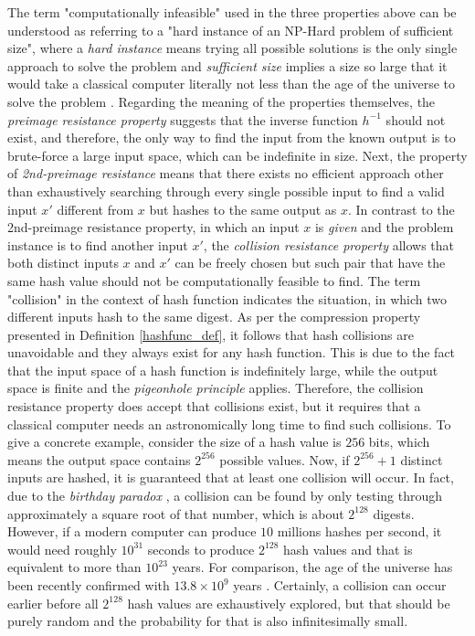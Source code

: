 The term "computationally infeasible" used in the three properties above can be understood as referring to a "hard instance of an NP-Hard problem of sufficient size", where a \textit{hard instance} means trying all possible solutions is the only single approach to solve the problem and \textit{sufficient size} implies a size so large that it would take a classical computer literally not less than the age of the universe to solve the problem \cite{henderson1976cryptography}.  
Regarding the meaning of the properties themselves, the \textit{preimage resistance property} suggests that the inverse function $h^{-1}$ should not exist, and therefore, the only way to find the input from the known output is to brute-force a large input space, which can be indefinite in size. Next, the property of \textit{2nd-preimage resistance} means that there exists no efficient approach other than exhaustively searching through every single possible input to find a valid input $x'$ different from $x$ but hashes to the same output as $x$. In contrast to the 2nd-preimage resistance property, in which an input $x$ is \textit{given} and the problem instance is to find another input $x'$, the \textit{collision resistance property} allows that both distinct inputs $x$ and $x'$ can be freely chosen but such pair that have the same hash value  should not be computationally feasible to find. The term "collision" in the context of hash function indicates the situation, in which two different inputs hash to the same digest. As per the compression property presented in Definition \ref{hashfunc_def}, it follows that hash collisions are unavoidable and they always exist for any hash function. This is due to the fact that the input space of a hash function is indefinitely large, while the output space is finite and the \textit{pigeonhole principle} \cite{herstein1969topics} applies. Therefore, the collision resistance property does accept that collisions exist, but it requires that a classical computer needs an astronomically long time to find such collisions. To give a concrete example, consider the size of a hash value is $256$ bits, which means the output space contains $2^{256}$ possible values. Now, if $2^{256} + 1$ distinct inputs are hashed, it is guaranteed that at least one collision will occur. In fact, due to the \textit{birthday paradox} \cite{abramson1970more}, a collision can be found by only testing through approximately a square root of that number, which is about $2^{128}$ digests. However, if a modern computer can produce $10$ millions hashes per second, it would need roughly $10^{31}$ seconds to produce $2^{128}$ hash values and that is equivalent to more than $10^{23}$ years. For comparison, the age of the universe has been recently confirmed with $13.8 \times 10^9$ years \cite{aghanim2020planck}. Certainly, a collision can occur earlier before all $2^{128}$ hash values are exhaustively explored, but that should be purely random and the probability for that is also infinitesimally small.

